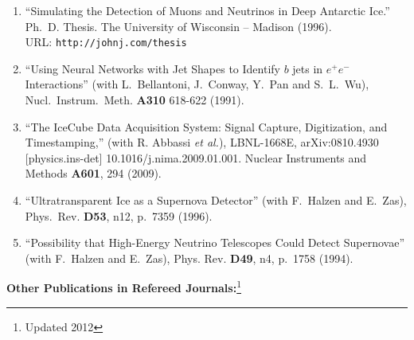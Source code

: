 \begin{enumerate}

\item ``Simulating the Detection of Muons and Neutrinos in Deep Antarctic Ice.'' Ph.~D. Thesis.  The University of Wisconsin -- Madison (1996).  \\URL: {\tt http://johnj.com/thesis}

\item ``Using Neural Networks with Jet Shapes to Identify
        $b$ jets in   $e^+ e^-$ Interactions'' (with
        L.~Bellantoni, J.~Conway, Y.~Pan and   S.~L.~Wu),
        Nucl.~Instrum.~Meth. {\bf A310} 618-622 (1991).

\item ``The IceCube Data Acquisition System: Signal Capture,
        Digitization, and Timestamping,'' (with R. Abbassi
        {\it et al.}), LBNL-1668E, arXiv:0810.4930
        [physics.ins-det] 10.1016/j.nima.2009.01.001.
        Nuclear Instruments and Methods {\bf A601}, 294
        (2009).

\item ``Ultratransparent Ice as a Supernova Detector'' (with
        F.~Halzen   and E.~Zas), Phys.~Rev. {\bf D53}, n12,
        p.~7359 (1996).

\item ``Possibility that High-Energy Neutrino Telescopes
        Could Detect   Supernovae'' (with F.~Halzen and
        E.~Zas), Phys. Rev. {\bf D49}, n4,   p.~1758 (1994).

\end{enumerate}

{\bf Other Publications in Refereed Journals:}\footnote{Updated 2012}

